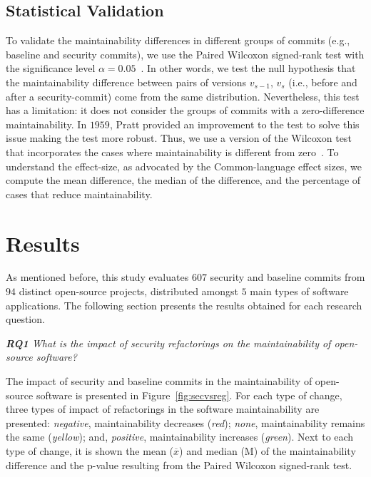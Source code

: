 \documentclass[sigconf,review]{acmart}
\begin{document}
\subsection{Statistical Validation}\label{sec:statsval}
%
To validate the maintainability differences in different groups of commits
(e.g., baseline and security commits), we use the Paired Wilcoxon signed-rank
test with the significance level $\alpha = 0.05$~\cite{10.2307/3001968}. In
other words, we test the null hypothesis that the maintainability difference
between pairs of versions $v_{s-1}$, $v_s$ (i.e., before and after a
security-commit) come from the same distribution. Nevertheless, this test has a
limitation: it does not consider the groups of commits with a zero-difference
maintainability. In $1959$, Pratt provided an improvement to the test to solve
this issue making the test more robust. Thus, we use a version of the Wilcoxon
test that incorporates the cases where maintainability is different from zero~\cite{10.2307/2282543}.
To understand the effect-size, as
advocated by the Common-language effect sizes\cite{graw:1992}, we compute the
mean difference, the median of the difference, and the percentage of cases that
reduce maintainability.
%
\section{Results}\label{sec:results}

As mentioned before, this study evaluates $607$ security and baseline commits
from $94$ distinct open-source projects, distributed amongst $5$ main
types of software applications. The following section presents the
results obtained for each research question.

\begin{framed}
\textit{\textbf{RQ1} What is the impact of security refactorings on the
maintainability of open-source software?}
\vspace{-0.1cm}
\end{framed}
\vspace{-0.1cm}

The impact of security and baseline commits in the maintainability of
open-source software is presented in Figure~\ref{fig:secvsreg}. For each type of
change, three types of impact of refactorings in the software maintainability
are presented: \emph{negative}, maintainability decreases (\emph{red});
\emph{none}, maintainability remains the same (\emph{yellow}); and,
\emph{positive}, maintainability increases (\emph{green}). Next to each
type of change, it is shown the mean ($\overline{x}$) and median (M)
of the maintainability difference and the p-value resulting from the
Paired Wilcoxon signed-rank test.
\end{document}

